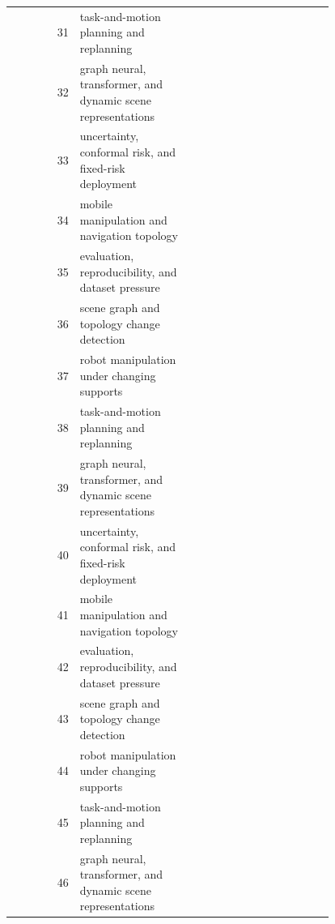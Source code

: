 \documentclass{article}
\begin{document}
\begin{longtable}{r p{0.34\linewidth} p{0.45\linewidth}}
31 & task-and-motion planning and replanning & \citep{conci2014global91,wouw2016hierarchical92,hao2021the93} \\
32 & graph neural, transformer, and dynamic scene representations & \citep{koyama2016ir94,alaba2022a95,shao20183d96} \\
33 & uncertainty, conformal risk, and fixed-risk deployment & \citep{miao2023longterm97,hu2024llm98,nikam2025on99} \\
34 & mobile manipulation and navigation topology & \citep{mohammed2024insights100,sui2017sum101,lu2020a102} \\
35 & evaluation, reproducibility, and dataset pressure & \citep{zhou2020offsite103,spinos2021topological104,zhang2023irregular105} \\
36 & scene graph and topology change detection & \citep{zhou2024towards106,oh2015a107,bossens2022resilient108} \\
37 & robot manipulation under changing supports & \citep{wu2021apple109,wong2021manipulation110,olszewska2016tracking111} \\
38 & task-and-motion planning and replanning & \citep{skoczen2021obstacle112,torres2021learning113,liu2026a114} \\
39 & graph neural, transformer, and dynamic scene representations & \citep{chen2022openvocabulary115,bao2012withdrawn116,zhang2023languageassisted117} \\
40 & uncertainty, conformal risk, and fixed-risk deployment & \citep{greene2023scene118,ding2024kalmanbased119,chang2023exploration120} \\
41 & mobile manipulation and navigation topology & \citep{grushko2021improved121,li2020a122,seenivasan2022biomimetic123} \\
42 & evaluation, reproducibility, and dataset pressure & \citep{zhangndfmt124,zhao2026visionbased125,murlidaranndeye126} \\
43 & scene graph and topology change detection & \citep{dalalnda127,chen2025change128,liu2025mechanical129} \\
44 & robot manipulation under changing supports & \citep{kang2025doros130,musculus2021movement131,ye2017what132} \\
45 & task-and-motion planning and replanning & \citep{kuvich2005automatic133,majhi2024humanscene134,nan2012a135} \\
46 & graph neural, transformer, and dynamic scene representations & \citep{khan2024neusyre136,analooee2025dmtm137,looper20233d138} \\

\end{longtable}
\end{document}
